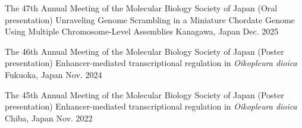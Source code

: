 \begin{cventries}

  \cventrypub
    {The 47th Annual Meeting of the Molecular Biology Society of Japan (Oral presentation)} %
    {Unraveling Genome Scrambling in a Miniature Chordate Genome Using Multiple Chromosome-Level Assemblies} %
    {Kanagawa, Japan} %
    {Dec. 2025} %

  \cventrypub
    {The 46th Annual Meeting of the Molecular Biology Society of Japan (Poster presentation)} %
    {Enhancer-mediated transcriptional regulation in \textit{Oikopleura dioica}} %
    {Fukuoka, Japan} %
    {Nov. 2024} %

  \cventrypub
    {The 45th Annual Meeting of the Molecular Biology Society of Japan (Poster presentation)} %
    {Enhancer-mediated transcriptional regulation in \textit{Oikopleura dioica}} %
    {Chiba, Japan} %
    {Nov. 2022} %


\end{cventries}

\renewcommand{\baselinestretch}{0.9}
